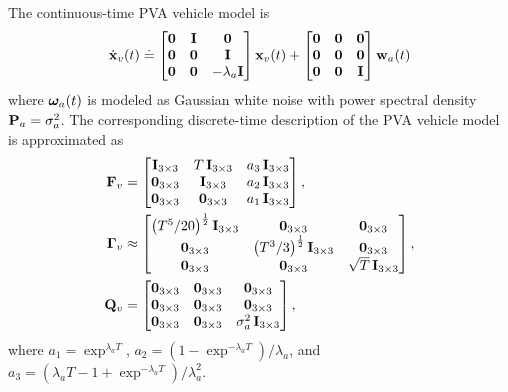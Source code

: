 The continuous-time PVA vehicle model is
\begin{align}
	\dot{\mathbf{x}}_v(t) \doteq 
	\begin{bmatrix}
		\boldsymbol{0} & \mathbf{I} & \boldsymbol{0} \\ \boldsymbol{0} & \boldsymbol{0} & \mathbf{I} \\ \boldsymbol{0} & \boldsymbol{0} & -\lambda_a \mathbf{I}
	\end{bmatrix} 
	\mathbf{x}_v(t) +
	\begin{bmatrix} \boldsymbol{0} & \boldsymbol{0} & \boldsymbol{0} \\ \boldsymbol{0} & \boldsymbol{0} & \boldsymbol{0} \\ \boldsymbol{0} & \boldsymbol{0} & \mathbf{I} \end{bmatrix} \mathbf{w}_a(t)
\end{align}
where $\boldsymbol{\omega}_a(t)$ is modeled as Gaussian white noise with power spectral density $\mathbf{P}_a = \sigma^2_a$. 
The corresponding discrete-time description of the PVA vehicle model is approximated as
\begin{align}
	\mathbf{F}_v &= 
	\begin{bmatrix}
		\mathbf{I}_{3 \times 3} & T\,\mathbf{I}_{3 \times 3} & a_3 \, \mathbf{I}_{3 \times 3} \\
		\boldsymbol{0}_{3 \times 3} & \mathbf{I}_{3 \times 3} & a_2 \, \mathbf{I}_{3 \times 3} \\
		\boldsymbol{0}_{3 \times 3} & \boldsymbol{0}_{3 \times 3} & a_1 \, \mathbf{I}_{3 \times 3}
	\end{bmatrix}, ~ \\
	\boldsymbol{\Gamma}_v &\approx
	\begin{bmatrix}
		\big(T^5/20 \big)^{\frac{1}{2}} \, \mathbf{I}_{3 \times 3} & \boldsymbol{0}_{3 \times 3} & \boldsymbol{0}_{3 \times 3}\\
		\boldsymbol{0}_{3 \times 3} & \big(T^3 / 3\big)^{\frac{1}{2}} \, \mathbf{I}_{3 \times 3} & \boldsymbol{0}_{3 \times 3} \\
		\boldsymbol{0}_{3 \times 3} & \boldsymbol{0}_{3 \times 3} & \sqrt{T} \, \mathbf{I}_{3 \times 3}
	\end{bmatrix}, \\ 
	\mathbf{Q}_{v} &= 
	\begin{bmatrix} \boldsymbol{0}_{3 \times 3} & \boldsymbol{0}_{3 \times 3} & \boldsymbol{0}_{3 \times 3} \\ 
					\boldsymbol{0}_{3 \times 3} & \boldsymbol{0}_{3 \times 3} & \boldsymbol{0}_{3 \times 3} \\
		 			\boldsymbol{0}_{3 \times 3} & \boldsymbol{0}_{3 \times 3} & \sigma^2_a \, \mathbf{I}_{3 \times 3} 
	\end{bmatrix},
\end{align}
where $a_1 = \exp^{\lambda_a T}$, $a_2 = (1 - \exp^{-\lambda_a T})/ \lambda_a$, and $a_3 = (\lambda_a T - 1 + \exp^{-\lambda_a T})/ \lambda_a^2$.